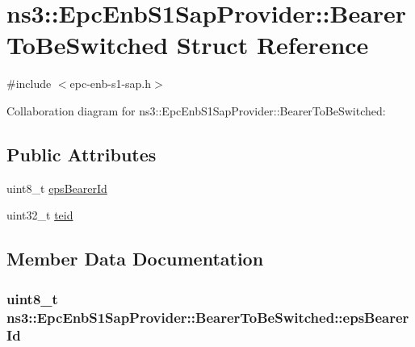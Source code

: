 \hypertarget{structns3_1_1EpcEnbS1SapProvider_1_1BearerToBeSwitched}{}\section{ns3\+:\+:Epc\+Enb\+S1\+Sap\+Provider\+:\+:Bearer\+To\+Be\+Switched Struct Reference}
\label{structns3_1_1EpcEnbS1SapProvider_1_1BearerToBeSwitched}


{\ttfamily \#include $<$epc-\/enb-\/s1-\/sap.\+h$>$}



Collaboration diagram for ns3\+:\+:Epc\+Enb\+S1\+Sap\+Provider\+:\+:Bearer\+To\+Be\+Switched\+:
\subsection*{Public Attributes}
\begin{DoxyCompactItemize}
\item 
uint8\+\_\+t \hyperlink{structns3_1_1EpcEnbS1SapProvider_1_1BearerToBeSwitched_a44e7e23876a31ddd3f903fa33bbb2396}{eps\+Bearer\+Id}
\item 
uint32\+\_\+t \hyperlink{structns3_1_1EpcEnbS1SapProvider_1_1BearerToBeSwitched_a12705e29d058ee33a767acf3088212a3}{teid}
\end{DoxyCompactItemize}


\subsection{Member Data Documentation}
\subsubsection[{\texorpdfstring{eps\+Bearer\+Id}{epsBearerId}}]{\setlength{\rightskip}{0pt plus 5cm}uint8\+\_\+t ns3\+::\+Epc\+Enb\+S1\+Sap\+Provider\+::\+Bearer\+To\+Be\+Switched\+::eps\+Bearer\+Id}\hypertarget{structns3_1_1EpcEnbS1SapProvider_1_1BearerToBeSwitched_a44e7e23876a31ddd3f903fa33bbb2396}{}\label{structns3_1_1EpcEnbS1SapProvider_1_1BearerToBeSwitched_a44e7e23876a31ddd3f903fa33bbb2396}
